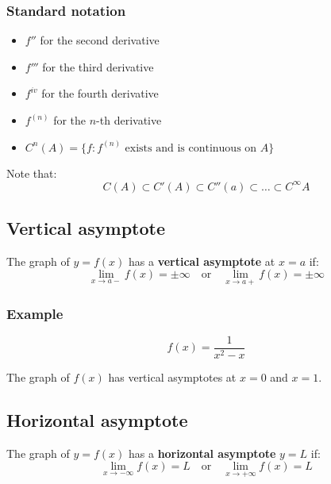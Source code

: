 \documentclass[11pt]{article}
\begin{document}
\subsubsection{Standard notation}
\label{sec:orgaa3d224}
\begin{itemize}
\item \(f''\) for the second derivative
\item \(f'''\) for the third derivative
\item \(f^{iv}\) for the fourth derivative
\item \(f^{(n)}\) for the \(n\)-th derivative
\item \(C^n (A) = \{f: f^{(n)} \text{ exists and is continuous on } A\}\)
\end{itemize}

Note that:
\[C(A) \subset C'(A) \subset C''(a) \subset \ldots \subset C^{\infty} A\]

\newpage

\subsection{Vertical asymptote}
\label{sec:orgf988770}
The graph of \(y = f(x)\) has a \textbf{vertical asymptote} at \(x = a\) if:
\[\lim_{x \rightarrow a-} f(x) = \pm \infty \quad \text{or} \quad \lim_{x \rightarrow a+} f(x) = \pm \infty\]

\subsubsection{Example}
\label{sec:org55271b1}
\[f(x) = \frac{1}{x^2 - x}\]

The graph of \(f(x)\) has vertical asymptotes at \(x = 0\) and \(x = 1\).

\begin{center}
\end{center}

\newpage

\subsection{Horizontal asymptote}
\label{sec:org36b1f44}
The graph of \(y = f(x)\) has a \textbf{horizontal asymptote} \(y = L\) if:
\[\lim_{x \rightarrow -\infty} f(x) = L \quad \text{or} \quad \lim_{x \rightarrow +\infty} f(x) = L\]
\end{document}
